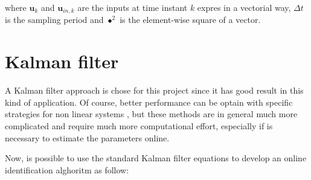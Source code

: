 \noindent where $\mathbf{u}_k$ and $\mathbf{u}_{in,k}$ are the inputs at time instant $k$ expres in a vectorial way, $\Delta t$ is the sampling period and $\bullet^2$ is the element-wise square of a vector.


\section{Kalman filter}
\label{KalmanFilter}

A Kalman filter approach is chose for this project since it has good result in this kind of application. Of course, better performance can be optain with specific strategies for non linear systems \cite{parameterIdentification}, but these methods are in general much more complicated and require much more computational effort, especially if is necessary to estimate the parameters online.  

\noindent Now, is possible to use the standard Kalman filter equations \cite{KalmanFilter} to develop an online identification alghoritm as follow:

